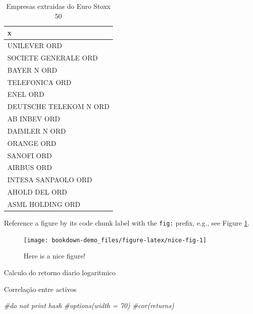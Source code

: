 \documentclass[
  12pt,
  a4paper,
  openany]{book}
\newenvironment{Shaded}{\begin{snugshade}}{\end{snugshade}}
\newcommand{\CommentTok}[1]{\textcolor[rgb]{0.56,0.35,0.01}{\textit{#1}}}
\begin{document}
\begin{table}[!h]

\caption{\label{tab:nice-tab}Empresas extraidas do Euro Stoxx 50}
\centering
\begin{tabular}[t]{l}
\toprule
x\\
\midrule
UNILEVER ORD\\
SOCIETE GENERALE ORD\\
BAYER N ORD\\
TELEFONICA ORD\\
ENEL ORD\\
\addlinespace
DEUTSCHE TELEKOM N ORD\\
AB INBEV ORD\\
DAIMLER N ORD\\
ORANGE ORD\\
SANOFI ORD\\
\addlinespace
AIRBUS ORD\\
INTESA SANPAOLO ORD\\
AHOLD DEL ORD\\
ASML HOLDING ORD\\
\bottomrule
\end{tabular}
\end{table}

\normalsize

Reference a figure by its code chunk label with the \texttt{fig:} prefix, e.g., see Figure \ref{fig:nice-fig}.
\scriptsize

\begin{figure}

{\centering \texttt{[image: bookdown-demo\_files/figure-latex/nice-fig-1]} 

}

\caption{Here is a nice figure!}\label{fig:nice-fig}
\end{figure}

Calculo do retorno diario logaritmico
\scriptsize

\normalsize

Correlação entre activos
\scriptsize

\begin{Shaded}
\begin{Highlighting}[]
\CommentTok{\#do not print hash}
\CommentTok{\#options(width = 70)}
\CommentTok{\#cor(returns)}
\end{Highlighting}
\end{Shaded}

\normalsize

\scriptsize
\end{document}
